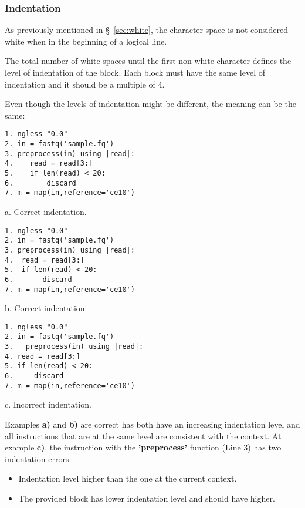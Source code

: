 \documentclass{article}
\begin{document}
\subsubsection{Indentation}
\label{sec:indentation}

As previously mentioned in §~\ref{sec:white}, the character space is not considered white when in the beginning of a logical line.

The total number of white spaces until the first non-white character defines the level of indentation of the block. Each block must have the same level of indentation and it should be a multiple of 4.

Even though the levels of indentation might be different, the meaning can be the same:

\begin{multicols}{3}
\scriptsize
\begin{verbatim}
1. ngless "0.0"
2. in = fastq('sample.fq')
3. preprocess(in) using |read|:
4.    read = read[3:]
5.    if len(read) < 20:
6.        discard
7. m = map(in,reference='ce10')
\end{verbatim}
\normalsize
a. Correct indentation.
\columnbreak %
\scriptsize

\begin{verbatim}
1. ngless "0.0"
2. in = fastq('sample.fq')
3. preprocess(in) using |read|:
4.  read = read[3:]
5.  if len(read) < 20:
6.       discard
7. m = map(in,reference='ce10')
\end{verbatim}
\normalsize
b. Correct indentation.

\columnbreak %
\scriptsize
\begin{verbatim}
1. ngless "0.0"
2. in = fastq('sample.fq')
3.   preprocess(in) using |read|:
4. read = read[3:]
5. if len(read) < 20:
6.     discard
7. m = map(in,reference='ce10')
\end{verbatim}
\normalsize
c. Incorrect indentation.

\end{multicols}


Examples \textbf{a)} and \textbf{b)} are correct has both have an increasing indentation level and all instructions that are at the same level are consistent with the context. At example \textbf{c)}, the instruction with the \textbf{'preprocess'} function (Line 3) has two indentation errors:
\begin{itemize}
\item Indentation level higher than the one at the current context.
\item The provided block has lower indentation level and should have higher.
\end{itemize}
\end{document}
